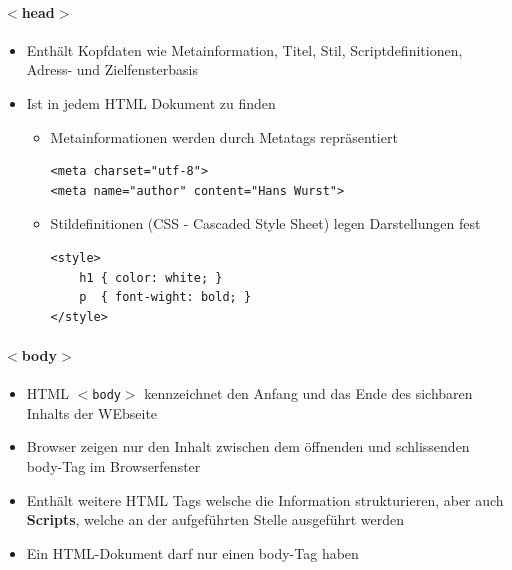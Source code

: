 \documentclass[10pt,a4paper]{article}
\begin{document}
\paragraph{$<$head$>$ }
\begin{itemize}[noitemsep,topsep=0pt,leftmargin=*]
    \item Enthält Kopfdaten wie Metainformation, Titel, Stil, Scriptdefinitionen, Adress- und Zielfensterbasis
    \item Ist in jedem HTML Dokument zu finden
    \begin{itemize}[noitemsep,topsep=0pt,leftmargin=*]
        \item Metainformationen werden durch Metatags repräsentiert
        \lstset{language=HTML}
        \begin{lstlisting}
<meta charset="utf-8">
<meta name="author" content="Hans Wurst">
        \end{lstlisting}
        \item Stildefinitionen (CSS - Cascaded Style Sheet) legen Darstellungen fest
        \begin{lstlisting}
<style>
    h1 { color: white; }
    p  { font-wight: bold; }
</style>
        \end{lstlisting}
    \end{itemize}
\end{itemize}

\paragraph{$<$body$>$}
\begin{itemize}[noitemsep,topsep=0pt,leftmargin=*]
    \item HTML \texttt{$<$body$>$} kennzeichnet den Anfang und das Ende des sichbaren Inhalts der WEbseite
    \item Browser zeigen nur den Inhalt zwischen dem öffnenden und schlissenden body-Tag im Browserfenster
    \item Enthält weitere HTML Tags welsche die Information strukturieren, aber auch \textbf{Scripts}, welche an der aufgeführten Stelle ausgeführt werden
    \item Ein HTML-Dokument darf nur einen body-Tag haben
\end{itemize}
\end{document}
